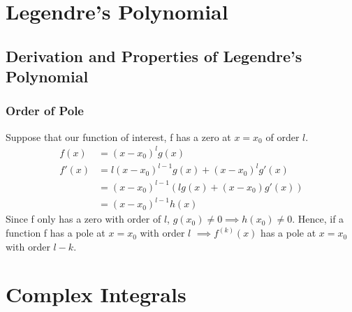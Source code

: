 \documentclass{report}
\begin{document}
\chapter{Legendre's Polynomial}
\section{Derivation and Properties of Legendre's Polynomial}
\subsection{Order of Pole}
Suppose that our function of interest, f has a zero at $x = x_0$ of order $l$.
\begin{align*}
f(x) &= (x-x_0)^lg(x) \\
f'(x)&=l(x-x_0)^{l-1}g(x)+(x-x_0)^lg'(x) \\
&= (x-x_0)^{l-1}(lg(x)+(x-x_0)g'(x)) \\
&= (x-x_0)^{l-1}h(x)
\end{align*}
Since f only has a zero with order of $l$, $g(x_0)\neq 0 \implies h(x_0)\neq 0$. Hence, if a function f has a pole at $x=x_0$ with order $l$ $\implies f^{(k)}(x)$ has a pole at $x=x_0$ with order $l-k$. 
\chapter{Complex Integrals}
\end{document}
